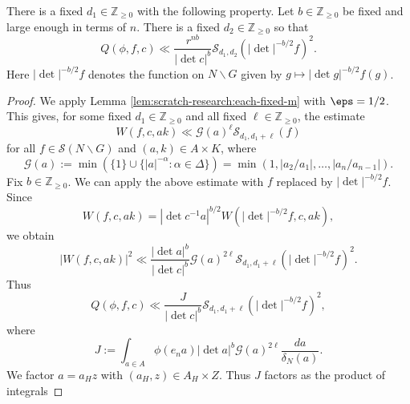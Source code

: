 \begin{lemma}\label{lem:sub-gln:there-fixed-x}
  There is a fixed $d_1 \in \mathbb{Z}_{\geq 0}$ with the following property.  Let $b \in \mathbb{Z}_{\geq 0}$ be fixed and large enough in terms of $n$.  There is a fixed $d_2 \in \mathbb{Z}_{\geq 0}$ so that
  \begin{equation*}
    Q(\phi,f,c)
    \ll
    \frac{r^{n b}}{|\det c|^b}
    \mathcal{S}_{d_1,d_2} ( |\det|^{-b/2} f)^2.
  \end{equation*}
  Here $|\det|^{-b/2} f$ denotes the function on $N \backslash G$ given by $g \mapsto |\det g|^{-b/2} f(g)$.
\end{lemma}
\begin{proof}
  We apply Lemma \ref{lem:scratch-research:each-fixed-m} with $\eps = 1/2$.  This gives, for some fixed $d_1 \in \mathbb{Z}_{\geq 0}$ and all fixed $\ell \in \mathbb{Z}_{\geq 0}$, the estimate
  \begin{equation*}
    W(f,c,a k) \ll \mathcal{G}(a)^{\ell} \mathcal{S}_{d_1, d_1+\ell}(f)
  \end{equation*}
  for all $f \in \mathcal{S}(N \backslash G)$ and $(a,k) \in A \times K$, where
  \begin{equation*}
    \mathcal{G}(a) := \min(\{1\} \cup \{|a|^{-\alpha} : \alpha \in \Delta \})
    =
    \min(1, |a_2/a_1|, \dotsc, |a_n / a_{n-1}|).
  \end{equation*}
  Fix $b \in \mathbb{Z}_{\geq 0}$.  We can apply the above estimate with $f$ replaced by $|\det|^{-b/2} f$.   Since
  \begin{equation*}
    W(f,c, a k)
    =
    |\det c^{-1} a|^{b/2}
    W(|\det|^{-b/2} f, c, a k),
  \end{equation*}
  we obtain
  \begin{equation}\label{eq:wf-c-k2}
    |W(f, c, a k)|^2 \ll
    \frac{|\det a|^{b}}{|\det c|^b}
    \mathcal{G}(a)^{2 \ell} \mathcal{S}_{d_1, d_1 + \ell} ( |\det|^{-b/2} f)^2.
  \end{equation}
  Thus
  \begin{equation*}
    Q(\phi,f,c) \ll
    \frac{J}{|\det c|^b}
    \mathcal{S}_{d_1, d_1 + \ell} ( |\det|^{-b/2} f)^2,
  \end{equation*}
  where
  \begin{equation*}
    J := \int_{a \in A}
    \phi(e_n a)
    |\det a|^b
    \mathcal{G}(a)^{2 \ell}
    \frac{d a}{\delta_N(a)}.
  \end{equation*}
  We factor $a = a_H z$ with $(a_H,z)  \in A_H \times Z$.  Thus $J$ factors as the product of integrals

\end{proof}
